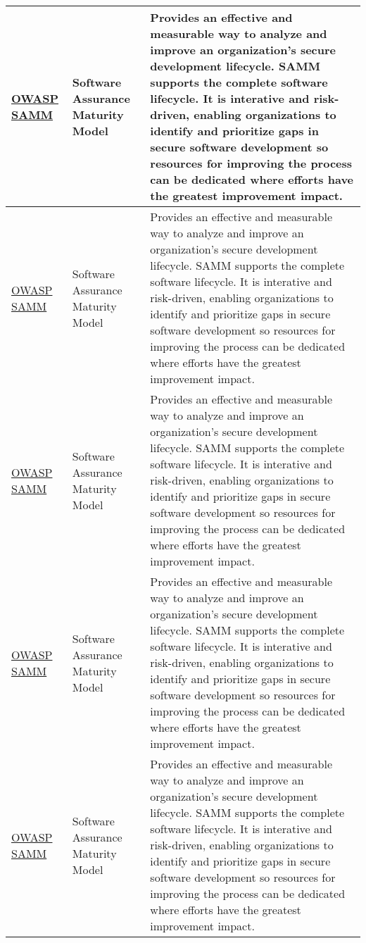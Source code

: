 \begin{longtable}[c]{|p{}|p{}|p{}|}
  \hline
  \href{https://owasp.org/www-project-samm/}{OWASP SAMM} & Software Assurance Maturity Model & Provides an effective and measurable way to analyze and improve an organization's secure development lifecycle. SAMM supports the complete software lifecycle. It is interative and risk-driven, enabling organizations to identify and prioritize gaps in secure software development so resources for improving the process can be dedicated where efforts have the greatest improvement impact. \\
  \hline
  \href{https://owasp.org/www-project-samm/}{OWASP SAMM} & Software Assurance Maturity Model & Provides an effective and measurable way to analyze and improve an organization's secure development lifecycle. SAMM supports the complete software lifecycle. It is interative and risk-driven, enabling organizations to identify and prioritize gaps in secure software development so resources for improving the process can be dedicated where efforts have the greatest improvement impact. \\
  \hline
  \href{https://owasp.org/www-project-samm/}{OWASP SAMM} & Software Assurance Maturity Model & Provides an effective and measurable way to analyze and improve an organization's secure development lifecycle. SAMM supports the complete software lifecycle. It is interative and risk-driven, enabling organizations to identify and prioritize gaps in secure software development so resources for improving the process can be dedicated where efforts have the greatest improvement impact. \\
  \hline
  \href{https://owasp.org/www-project-samm/}{OWASP SAMM} & Software Assurance Maturity Model & Provides an effective and measurable way to analyze and improve an organization's secure development lifecycle. SAMM supports the complete software lifecycle. It is interative and risk-driven, enabling organizations to identify and prioritize gaps in secure software development so resources for improving the process can be dedicated where efforts have the greatest improvement impact. \\
  \hline
  \href{https://owasp.org/www-project-samm/}{OWASP SAMM} & Software Assurance Maturity Model & Provides an effective and measurable way to analyze and improve an organization's secure development lifecycle. SAMM supports the complete software lifecycle. It is interative and risk-driven, enabling organizations to identify and prioritize gaps in secure software development so resources for improving the process can be dedicated where efforts have the greatest improvement impact. \\

\end{longtable}
